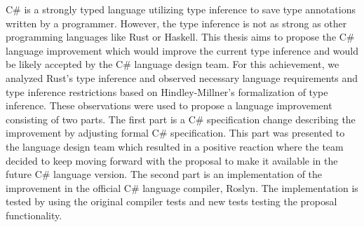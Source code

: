 \documentclass[12pt]{report}
\begin{document}

C\# is a strongly typed language utilizing type inference to save type annotations written by a programmer. 
However, the type inference is not as strong as other programming languages like Rust or Haskell.
This thesis aims to propose the C\# language improvement which would improve the current type inference and would be likely accepted by the C\# language design team. For this achievement, we analyzed Rust's type inference and observed necessary language requirements and type inference restrictions based on Hindley-Millner's formalization of type inference. 
These observations were used to propose a language improvement consisting of two parts. 
The first part is a C\# specification change describing the improvement by adjusting formal C\# specification. 
This part was presented to the language design team which resulted in a positive reaction where the team decided to keep moving forward with the proposal to make it available in the future C\# language version. 
The second part is an implementation of the improvement in the official C\# language compiler, Roslyn. 
The implementation is tested by using the original compiler tests and new tests testing the proposal functionality. 
\end{document}

